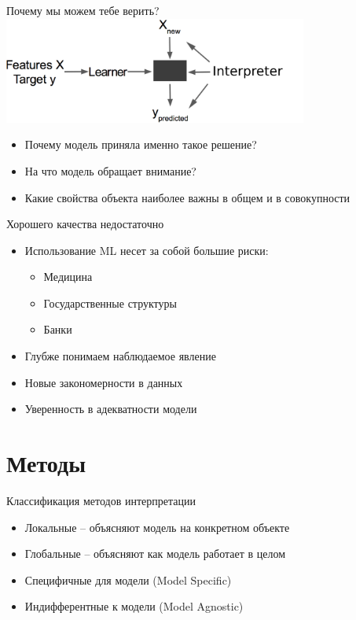 \documentclass[fleqn, xcolor=x11names]{beamer}
\begin{document}
\begin{frame}{Почему мы можем тебе верить?}
    \centering
    \includegraphics[width=10cm]{interpreter.png}
    \begin{itemize}
        \item Почему модель приняла именно такое решение?
        \item На что модель обращает внимание?
        \item Какие свойства объекта наиболее важны в общем и в совокупности
    \end{itemize}
    
\end{frame}

\begin{frame}{Хорошего качества недостаточно}
    \begin{itemize}
        \item Использование ML несет за собой большие риски:
        \begin{itemize}
            \item Медицина 
            \item Государственные структуры
            \item Банки
        \end{itemize}

        \item Глубже понимаем наблюдаемое явление 
        \item Новые закономерности в данных
        \item Уверенность в адекватности модели
    \end{itemize}
    
\end{frame}

\section{Методы}

\begin{frame}{Классификация методов интерпретации}
    \begin{itemize}
        \item Локальные -- объясняют модель на конкретном объекте
        \item Глобальные -- объясняют как модель работает в целом
        \vspace{10pt}
        \item Специфичные для модели (Model Specific) 
        \item Индифферентные к модели (Model Agnostic)
    \end{itemize}
\end{frame}
\end{document}
